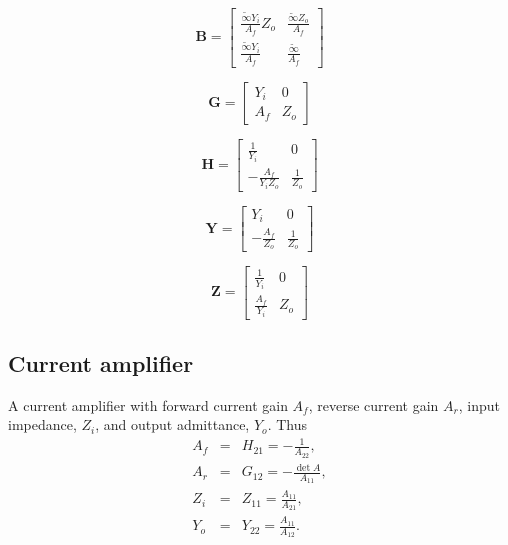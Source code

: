 \documentclass[a4paper, 12pt]{article}
\newcommand{\mat}[1]{\mathbf{#1}}
\begin{document}
\begin{equation}
\mat{B} = \left[\begin{matrix}\frac{\tilde{\infty} Y_{i}}{A_{f}} Z_{o} & \frac{\tilde{\infty} Z_{o}}{A_{f}}\\\frac{\tilde{\infty} Y_{i}}{A_{f}} & \frac{\tilde{\infty}}{A_{f}}\end{matrix}\right]
\end{equation}

\begin{equation}
\mat{G} = \left[\begin{matrix}Y_{i} & 0\\A_{f} & Z_{o}\end{matrix}\right]
\end{equation}

\begin{equation}
\mat{H} =\left[\begin{matrix}\frac{1}{Y_{i}} & 0\\- \frac{A_{f}}{Y_{i} Z_{o}} & \frac{1}{Z_{o}}\end{matrix}\right]
\end{equation}


\begin{equation}
\mat{Y} = \left[\begin{matrix}Y_{i} & 0\\- \frac{A_{f}}{Z_{o}} & \frac{1}{Z_{o}}\end{matrix}\right]
\end{equation}

\begin{equation}
\mat{Z} = \left[\begin{matrix}\frac{1}{Y_{i}} & 0\\\frac{A_{f}}{Y_{i}} & Z_{o}\end{matrix}\right]
\end{equation}


\subsection{Current amplifier}

A current amplifier with forward current gain $A_f$, reverse current
gain $A_r$, input impedance, $Z_i$, and output admittance, $Y_o$.
Thus
%
\begin{eqnarray}
A_f & = &  H_{21} = -\frac{1}{A_{22}}, \\
A_r & = &  G_{12} = -\frac{\det{A}}{A_{11}}, \\
Z_i & = &  Z_{11} = \frac{A_{11}}{A_{21}}, \\
Y_o & = &  Y_{22} = \frac{A_{11}}{A_{12}}.
\end{eqnarray}
\end{document}

